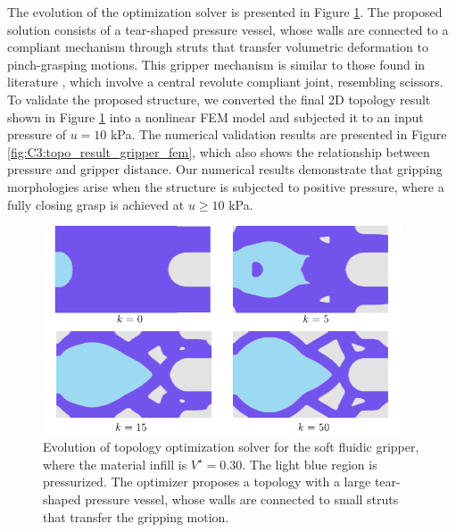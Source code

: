 The evolution of the optimization solver is presented in Figure \ref{fig:C3:topo_result_gripper}. The proposed solution consists of a tear-shaped pressure vessel, whose walls are connected to a compliant mechanism through struts that transfer volumetric deformation to pinch-grasping motions. This gripper mechanism is similar to those found in literature \cite{Gain2013Dec,Bendsoe2003}, which involve a central revolute compliant joint, resembling scissors. To validate the proposed structure, we converted the final 2D topology result shown in Figure \ref{fig:C3:topo_result_gripper} into a nonlinear FEM model and subjected it to an input pressure of $u = 10$ \si{\kilo \pascal}. The numerical validation results are presented in Figure \ref{fig:C3:topo_result_gripper_fem}, which also shows the relationship between pressure and gripper distance. Our numerical results demonstrate that gripping morphologies arise when the structure is subjected to positive pressure, where a fully closing grasp is achieved at $u \ge 10$ \si{\kilo \pascal}.

\begin{figure}[!t]
  \centering
  \includegraphics*[width=0.95\textwidth]{./pdf/thesis-figure-3-7.pdf}
  \caption{Evolution of topology optimization solver for the soft fluidic gripper, where the material infill is $V^\star = 0.30$. The light blue region is pressurized. The optimizer proposes a topology with a large tear-shaped pressure vessel, whose walls are connected to small struts that transfer the gripping motion.}
  \label{fig:C3:topo_result_gripper}
\end{figure}

